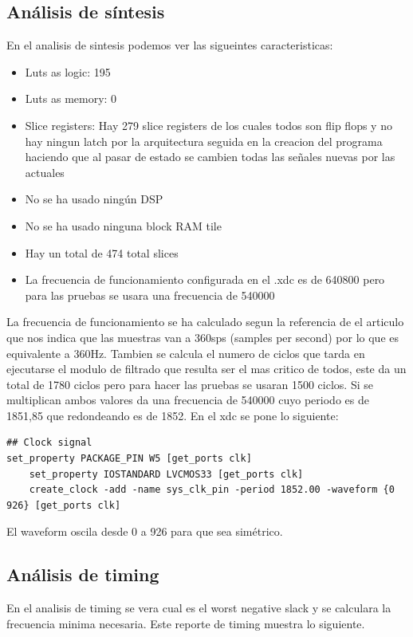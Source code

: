 \subsection{Análisis de síntesis}

	En el analisis de sintesis podemos ver las sigueintes caracteristicas:

	\begin{itemize}
		\item Luts as logic: 195
		\item Luts as memory: 0
		\item Slice registers: Hay 279 slice registers de los cuales todos son flip flops y no hay ningun latch por la arquitectura 
		seguida en la creacion del programa haciendo que al pasar de estado se cambien todas las señales nuevas por las actuales
		\item No se ha usado ningún DSP
		\item No se ha usado ninguna block RAM tile
		\item Hay un total de 474 total slices
		\item La frecuencia de funcionamiento configurada en el .xdc es de 640800 pero para las pruebas se usara una frecuencia de 540000
	\end{itemize}

	La frecuencia de funcionamiento se ha calculado segun la referencia de el articulo \cite{desai2021low} que nos indica que las muestras van a 360sps (samples per second) 
	por lo que es equivalente a 360Hz. Tambien se calcula el numero de ciclos que tarda en ejecutarse el modulo de filtrado que resulta ser el mas critico 
	de todos, este da un total de 1780 ciclos pero para hacer las pruebas se usaran 1500 ciclos. Si se multiplican ambos valores da una frecuencia de 540000 
	cuyo periodo es de 1851,85 que redondeando es de 1852. En el xdc se pone lo siguiente:

\lstset{language=VHDL, breaklines=true, basicstyle=\footnotesize}
\begin{lstlisting}[frame=single]
## Clock signal
set_property PACKAGE_PIN W5 [get_ports clk]							
	set_property IOSTANDARD LVCMOS33 [get_ports clk]
	create_clock -add -name sys_clk_pin -period 1852.00 -waveform {0 926} [get_ports clk]
\end{lstlisting}

El waveform oscila desde 0 a 926 para que sea simétrico.

\subsection{Análisis de timing}
	En el analisis de timing se vera cual es el worst negative slack y se calculara la frecuencia minima necesaria. Este reporte de timing muestra lo siguiente.

